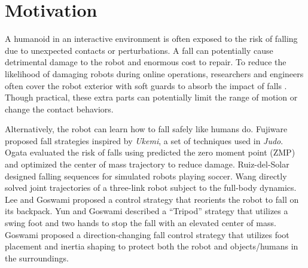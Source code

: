 \section{Motivation}
A humanoid in an interactive environment is often exposed to the
risk of falling due to unexpected contacts or perturbations. A fall
can potentially cause detrimental damage to the robot and enormous
cost to repair. To reduce the likelihood of damaging robots during
online operations, researchers and engineers often cover the robot
exterior with soft guards to absorb the impact of falls
\cite{Missura:2011:DEH,Kobayashi:2011:DHD}. Though practical, these
extra parts can potentially limit the range of motion or change the
contact behaviors.

Alternatively, the robot can learn how to fall safely like humans
do. Fujiware \etal
\cite{Fujiwara:2002:UFM,Fujiwara:2003:FHH,Fujiwara:2004:SKL,Fujiwara:2006:TOF,Fujiwara:2007:OPF}
proposed fall strategies inspired by \emph{Ukemi}, a set of techniques
used in \emph{Judo}.  Ogata \etal \cite{Ogata:2007:FMC,Ogata:2008:RSG}
evaluated the risk of falls using predicted the zero moment point
(ZMP) and optimized the center of mass trajectory to reduce damage.
Ruiz-del-Solar \etal \cite{Ruiz:2009:LTF,Ruiz:2010:FDM} designed
falling sequences for simulated robots playing soccer.
Wang \etal \cite{Wang:2012:WTO} directly solved joint trajectories
of a three-link robot subject to the full-body dynamics.
Lee and Goswami \cite{Lee:2012:FOB} proposed a control strategy that
reorients the robot to fall on its backpack.
Yun and Goswami \cite{Yun:2014:TFC} described a ``Tripod'' strategy that
utilizes a swing foot and two hands to stop the fall with an
elevated center of mass.  Goswami \etal \cite{Goswami:2014:DCF}
proposed a direction-changing fall control strategy that utilizes
foot placement and inertia shaping to protect both the 
robot and objects/humans in the surroundings.
  
